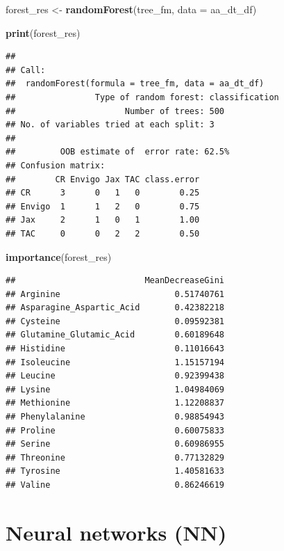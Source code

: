 \documentclass[12pt,openany]{book}
\newenvironment{Shaded}{\begin{snugshade}}{\end{snugshade}}
\newcommand{\KeywordTok}[1]{\textcolor[rgb]{0.13,0.29,0.53}{\textbf{#1}}}
\newcommand{\DataTypeTok}[1]{\textcolor[rgb]{0.13,0.29,0.53}{#1}}
\newcommand{\StringTok}[1]{\textcolor[rgb]{0.31,0.60,0.02}{#1}}
\newcommand{\NormalTok}[1]{#1}
\begin{document}
\begin{Shaded}
\begin{Highlighting}[]
\NormalTok{forest_res <-}\StringTok{ }\KeywordTok{randomForest}\NormalTok{(tree_fm, }\DataTypeTok{data =}\NormalTok{ aa_dt_df)}

\KeywordTok{print}\NormalTok{(forest_res)}
\end{Highlighting}
\end{Shaded}

\begin{verbatim}
## 
## Call:
##  randomForest(formula = tree_fm, data = aa_dt_df) 
##                Type of random forest: classification
##                      Number of trees: 500
## No. of variables tried at each split: 3
## 
##         OOB estimate of  error rate: 62.5%
## Confusion matrix:
##        CR Envigo Jax TAC class.error
## CR      3      0   1   0        0.25
## Envigo  1      1   2   0        0.75
## Jax     2      1   0   1        1.00
## TAC     0      0   2   2        0.50
\end{verbatim}

\begin{Shaded}
\begin{Highlighting}[]
\KeywordTok{importance}\NormalTok{(forest_res)}
\end{Highlighting}
\end{Shaded}

\begin{verbatim}
##                          MeanDecreaseGini
## Arginine                       0.51740761
## Asparagine_Aspartic_Acid       0.42382218
## Cysteine                       0.09592381
## Glutamine_Glutamic_Acid        0.60189648
## Histidine                      0.11016643
## Isoleucine                     1.15157194
## Leucine                        0.92399438
## Lysine                         1.04984069
## Methionine                     1.12208837
## Phenylalanine                  0.98854943
## Proline                        0.60075833
## Serine                         0.60986955
## Threonine                      0.77132829
## Tyrosine                       1.40581633
## Valine                         0.86246619
\end{verbatim}

\section{Neural networks (NN)}\label{neural-networks-nn}
\end{document}
